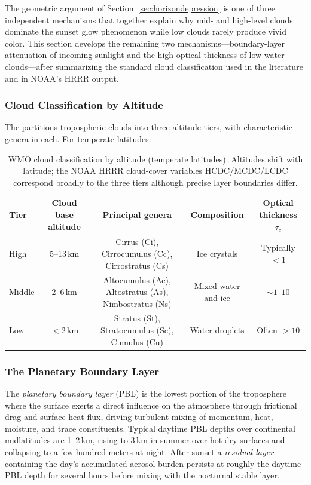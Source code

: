 \documentclass[11pt,a4paper]{article}
\begin{document}
The geometric argument of Section~\ref{sec:horizondepression} is one of three independent mechanisms that together explain why mid- and high-level clouds dominate the sunset glow phenomenon while low clouds rarely produce vivid color. This section develops the remaining two mechanisms---boundary-layer attenuation of incoming sunlight and the high optical thickness of low water clouds---after summarizing the standard cloud classification used in the literature and in NOAA's HRRR output.

\subsubsection{Cloud Classification by Altitude}

The \citet{wmo_cloud_atlas} partitions tropospheric clouds into three altitude tiers, with characteristic genera in each. For temperate latitudes:

\begin{table}[H]
\centering
\small
\begin{tabular}{lcccc}
\toprule
Tier & Cloud base altitude & Principal genera & Composition & Optical thickness $\tau_c$ \\
\midrule
High & 5--13\,km & Cirrus (Ci), Cirrocumulus (Cc), Cirrostratus (Cs) & Ice crystals & Typically $< 1$ \\
Middle & 2--6\,km & Altocumulus (Ac), Altostratus (As), Nimbostratus (Ns) & Mixed water and ice & $\sim 1$--$10$ \\
Low & $< 2$\,km & Stratus (St), Stratocumulus (Sc), Cumulus (Cu) & Water droplets & Often $> 10$ \\
\bottomrule
\end{tabular}
\caption{WMO cloud classification by altitude (temperate latitudes). Altitudes shift with latitude; the NOAA HRRR cloud-cover variables HCDC/MCDC/LCDC correspond broadly to the three tiers although precise layer boundaries differ.}
\label{tab:wmo}
\end{table}

\subsubsection{The Planetary Boundary Layer}

The \emph{planetary boundary layer} (PBL) is the lowest portion of the troposphere where the surface exerts a direct influence on the atmosphere through frictional drag and surface heat flux, driving turbulent mixing of momentum, heat, moisture, and trace constituents. Typical daytime PBL depths over continental midlatitudes are 1--2\,km, rising to 3\,km in summer over hot dry surfaces and collapsing to a few hundred meters at night. After sunset a \emph{residual layer} containing the day's accumulated aerosol burden persists at roughly the daytime PBL depth for several hours before mixing with the nocturnal stable layer.
\end{document}
